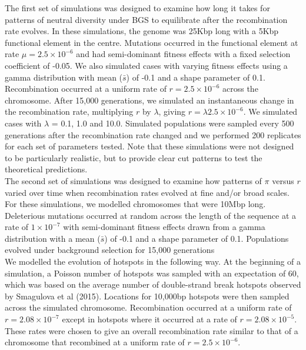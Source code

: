 \documentclass[10pt,twoside, twocolumn]{GSA_format}
\begin{document}
The first set of simulations was designed to examine how long it takes for patterns of neutral diversity under BGS to equilibrate after the recombination rate evolves. In these simulations, the genome was 25Kbp long with a 5Kbp functional element in the centre. Mutations occurred in the functional element at rate $\mu = 2.5\times10^{-6}$ and had semi-dominant fitness effects with a fixed selection coefficient of -0.05. We also simulated cases with varying fitness effects using a gamma distribution with mean ($\bar{s}$) of -0.1 and a shape parameter of 0.1. Recombination occurred at a uniform rate of $r = 2.5\times10^{-6}$ across the chromosome. After 15,000 generations, we simulated an instantaneous change in the recombination rate, multiplying $r$ by $\lambda$, giving $r = \lambda2.5\times10^{-6}$. We simulated cases with $\lambda$ = 0.1, 1.0 and 10.0. Simulated populations were sampled every 500 generations after the recombination rate changed and we performed 200 replicates for each set of parameters tested. Note that these simulations were not designed to be particularly realistic, but to provide clear cut patterns to test the theoretical predictions. \\

The second set of simulations was designed to examine how patterns of $\pi$ versus $r$ varied over time when recombination rates evolved at fine and/or broad scales. For these simulations, we modelled chromosomes that were 10Mbp long. Deleterious mutations occurred at random across the length of the sequence at a rate of $1\times10^{-7}$ with semi-dominant fitness effects drawn from a gamma distribution with a mean ($\bar{s}$) of -0.1 and a shape parameter of 0.1. Populations evolved under background selection for 15,000 generations  \\

We modelled the evolution of hotspots in the following way. At the beginning of a simulation, a Poisson number of hotspots was sampled with an expectation of 60, which was based on the average number of double-strand break hotspots observed by Smagulova et al (2015). Locations for 10,000bp hotspots were then sampled across the simulated chromosome. Recombination occurred at a uniform rate of $r=2.08\times10^{-7}$ except in hotspots where it occurred at a rate of $r=2.08\times10^{-5}$. These rates were chosen to give an overall recombination rate similar to that of a chromosome that recombined at a uniform rate of $r=2.5\times10^{-6}$. \\
\end{document}
